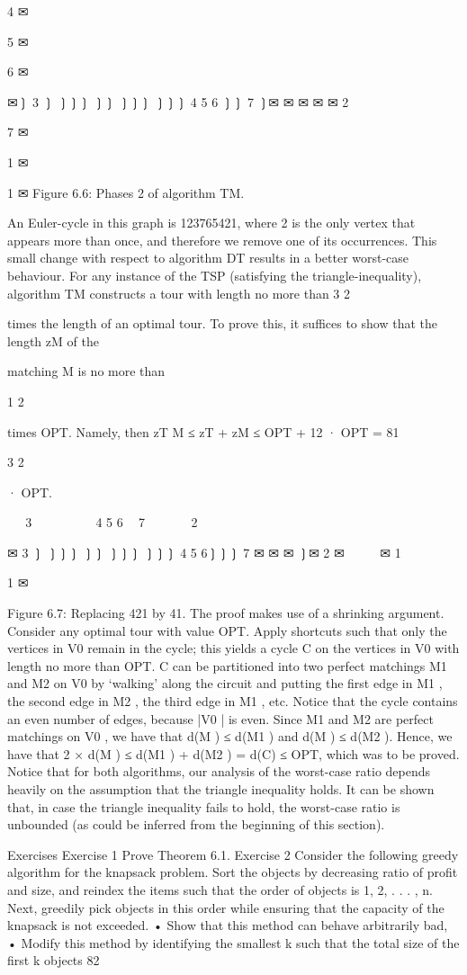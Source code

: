 4
✉

5
✉

6
✉

✉❳
3 ❳
❳❳❳
❳❳
❳❳❳
❳❳❳
4
5
6 ❳❳ 7
❳✉
✉
✉
✉
✉
2

7
✉

1 ✉

1 ✉
Figure 6.6: Phases 2 of algorithm TM.

An Euler-cycle in this graph is 123765421, where 2 is the only vertex that appears more than once, and
therefore we remove one of its occurrences.
This small change with respect to algorithm DT results in a better worst-case behaviour. For any instance
of the TSP (satisfying the triangle-inequality), algorithm TM constructs a tour with length no more than
3
2

times the length of an optimal tour. To prove this, it suffices to show that the length zM of the

matching M is no more than

1
2

times OPT. Namely, then zT M ≤ zT + zM ≤ OPT + 12 · OPT =
81

3
2

· OPT.

❳❳❳
3 ✉
❳❳
❳❳❳
❳❳
❳❳❳
4
5
6 ❳❳ 7
✉
✉
✉
✉
❳✉
2

✉
3 ❳
❳❳❳
❳❳
❳❳❳
❳❳❳
4
5
6❳❳❳ 7
✉
✉
✉
❳✉
2 ✉
 
 
 
✉
1  

1 ✉

Figure 6.7: Replacing 421 by 41.
The proof makes use of a shrinking argument. Consider any optimal tour with value OPT. Apply
shortcuts such that only the vertices in V0 remain in the cycle; this yields a cycle C on the vertices in
V0 with length no more than OPT. C can be partitioned into two perfect matchings M1 and M2 on V0
by ‘walking' along the circuit and putting the first edge in M1 , the second edge in M2 , the third edge in
M1 , etc. Notice that the cycle contains an even number of edges, because |V0 | is even.
Since M1 and M2 are perfect matchings on V0 , we have that d(M ) ≤ d(M1 ) and d(M ) ≤ d(M2 ). Hence,
we have that 2 × d(M ) ≤ d(M1 ) + d(M2 ) = d(C) ≤ OPT, which was to be proved.
Notice that for both algorithms, our analysis of the worst-case ratio depends heavily on the assumption
that the triangle inequality holds. It can be shown that, in case the triangle inequality fails to hold, the
worst-case ratio is unbounded (as could be inferred from the beginning of this section).

Exercises
Exercise 1
Prove Theorem 6.1.
Exercise 2
Consider the following greedy algorithm for the knapsack problem. Sort the objects by decreasing ratio
of profit and size, and reindex the items such that the order of objects is 1, 2, . . . , n. Next, greedily pick
objects in this order while ensuring that the capacity of the knapsack is not exceeded.
• Show that this method can behave arbitrarily bad,
• Modify this method by identifying the smallest k such that the total size of the first k objects
82

